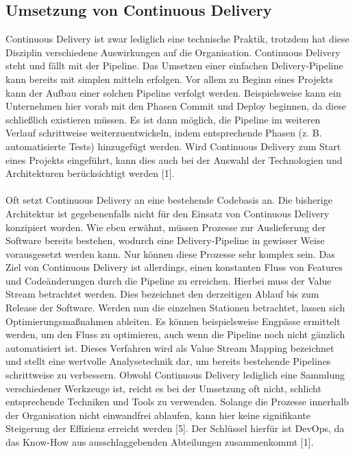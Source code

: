 \subsection{Umsetzung von Continuous Delivery}
Continuous Delivery ist zwar lediglich eine technische Praktik, trotzdem hat diese Disziplin verschiedene Auswirkungen auf die Organisation. Continuous Delivery steht und fällt mit der Pipeline. Das Umsetzen einer einfachen Delivery-Pipeline kann bereits mit simplen mitteln erfolgen. Vor allem zu Beginn eines Projekts kann der Aufbau einer solchen Pipeline verfolgt werden. Beispielsweise kann ein Unternehmen hier vorab mit den Phasen Commit und Deploy beginnen, da diese schließlich existieren müssen. Es ist dann möglich, die Pipeline im weiteren Verlauf schrittweise weiterzuentwickeln, indem entsprechende Phasen (z. B. automatisierte Tests) hinzugefügt werden. Wird Continuous Delivery zum Start eines Projekts eingeführt, kann dies auch bei der Auswahl der Technologien und Architekturen berücksichtigt werden [1]. \\ \\
Oft setzt Continuous Delivery an eine bestehende Codebasis an. Die bisherige Architektur ist gegebenenfalls nicht für den Einsatz von Continuous Delivery konzipiert worden. Wie eben erwähnt, müssen Prozesse zur Auslieferung der Software bereits bestehen, wodurch eine Delivery-Pipeline in gewisser Weise vorausgesetzt werden kann. Nur können diese Prozesse sehr komplex sein. Das Ziel von Continuous Delivery ist allerdings, einen konstanten Fluss von Features und Codeänderungen durch die Pipeline zu erreichen. Hierbei muss der Value Stream betrachtet werden. Dies bezeichnet den derzeitigen Ablauf bis zum Release der Software. Werden nun die einzelnen Stationen betrachtet, lassen sich Optimierungsmaßnahmen ableiten. Es können beispielsweise Engpässe ermittelt werden, um den Fluss zu optimieren, auch wenn die Pipeline noch nicht gänzlich automatisiert ist. Dieses Verfahren wird als Value Stream Mapping bezeichnet und stellt eine wertvolle Analysetechnik dar, um bereits bestehende Pipelines schrittweise zu verbessern. Obwohl Continuous Delivery lediglich eine Sammlung verschiedener Werkzeuge ist, reicht es bei der Umsetzung oft nicht, schlicht entsprechende Techniken und Tools zu verwenden. Solange die Prozesse innerhalb der Organisation nicht einwandfrei ablaufen, kann hier keine signifikante Steigerung der Effizienz erreicht werden [5]. Der Schlüssel hierfür ist DevOps, da das Know-How aus ausschlaggebenden Abteilungen zusammenkommt [1].

